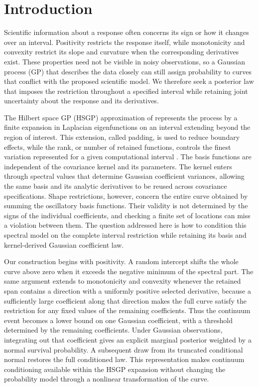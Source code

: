 \section{Introduction}\label{sec:introduction}

Scientific information about a response often concerns its sign or how
it changes over an interval. Positivity restricts the response itself,
while monotonicity and convexity restrict its slope and curvature when
the corresponding derivatives exist. These properties need not be
visible in noisy observations, so a Gaussian process (GP) that describes
the data closely can still assign probability to curves that conflict
with the proposed scientific model. We therefore seek a posterior law
that imposes the restriction throughout a specified interval while
retaining joint uncertainty about the response and its derivatives.

The Hilbert space GP (HSGP) approximation of \citet{solin2020hsgp}
represents the process by a finite expansion in Laplacian eigenfunctions
on an interval extending beyond the region of interest. This extension,
called padding, is used to reduce boundary effects, while the rank,
or number of retained functions, controls the finest variation represented
for a given computational interval \citep{riutort2023practicalhsgp}.
The basis functions are independent of the covariance kernel and its
parameters. The kernel enters through spectral values that determine
Gaussian coefficient variances, allowing the same basis and its analytic
derivatives to be reused across covariance specifications.
Shape restrictions, however, concern
the entire curve obtained by summing the oscillatory basis functions.
Their validity is not determined by the signs of the individual
coefficients, and checking a finite set of locations can miss a
violation between them. The question addressed here is how to
condition this spectral model on the complete interval restriction
while retaining its basis and kernel-derived Gaussian coefficient law.

Our construction begins with positivity. A random intercept shifts
the whole curve above zero when it exceeds the negative minimum of
the spectral part. The same argument extends to monotonicity and
convexity whenever the retained span contains a direction with a
uniformly positive selected derivative, because a sufficiently large
coefficient along that direction makes the full curve satisfy the
restriction for any fixed values of the remaining coefficients. Thus the
continuum event becomes a lower bound on one Gaussian coefficient,
with a threshold determined by the remaining coefficients. Under
Gaussian observations, integrating out that coefficient gives an
explicit marginal posterior weighted by a normal survival probability.
A subsequent draw from its truncated conditional normal restores
the full conditioned law. This representation makes continuum
conditioning available within the HSGP expansion without
changing the probability model through a nonlinear transformation
of the curve.

